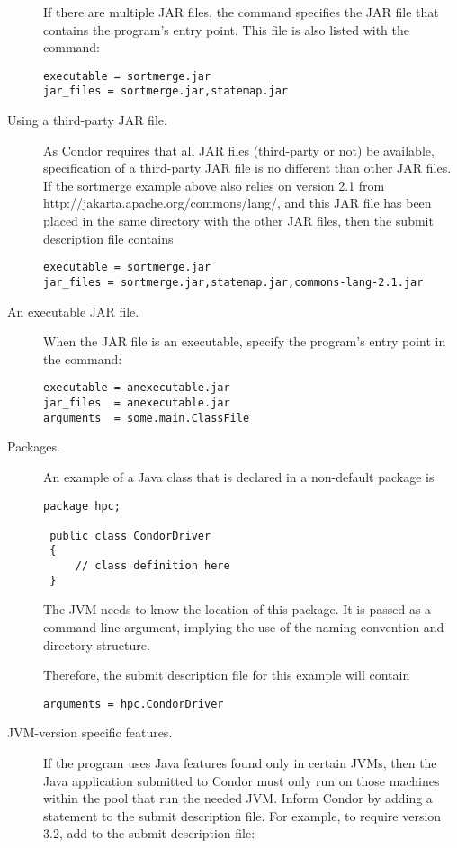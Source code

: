 \begin{description}
If there are multiple JAR files,
the  command specifies the JAR file
that contains the program's entry point.
This file is also listed with the  command:
\begin{verbatim}
executable = sortmerge.jar
jar_files = sortmerge.jar,statemap.jar
\end{verbatim}

\item[Using a third-party JAR file.]
As Condor requires that all JAR files (third-party or not)
be available,
specification of a third-party JAR file is no different than
other JAR files.
If the sortmerge example above also relies on
version 2.1 from http://jakarta.apache.org/commons/lang/,
and this JAR file has been placed in the same directory with
the other JAR files, then the submit description file contains
\footnotesize
\begin{verbatim}
executable = sortmerge.jar
jar_files = sortmerge.jar,statemap.jar,commons-lang-2.1.jar
\end{verbatim}
\normalsize

\item[An executable JAR file.]
When the JAR file is an executable, 
specify the program's entry point in the 
command:
\begin{verbatim}
executable = anexecutable.jar
jar_files  = anexecutable.jar
arguments  = some.main.ClassFile
\end{verbatim}

\item[Packages.]
An example of a Java class that is declared in a non-default
package is
\begin{verbatim}
package hpc;

 public class CondorDriver
 {
     // class definition here
 }
\end{verbatim}
The JVM needs to know the location of this package.
It is passed as a command-line argument, implying the use
of the naming convention and directory structure.

Therefore, the submit description file for this example will contain
\begin{verbatim}
arguments = hpc.CondorDriver
\end{verbatim}

\item[JVM-version specific features.]
If the program uses Java features found only in certain
JVMs, then the Java application submitted to Condor
must only run on those machines within the
pool that run the needed JVM.
Inform Condor by adding a 
statement to the submit description file.
For example, to require version 3.2, add to the submit description
file:


\end{description}
